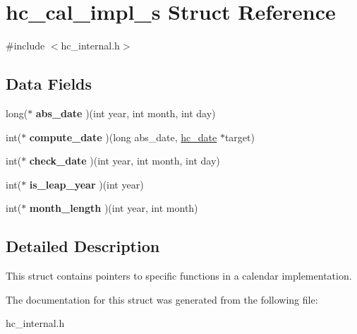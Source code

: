 \hypertarget{structhc__cal__impl__s}{}\section{hc\+\_\+cal\+\_\+impl\+\_\+s Struct Reference}
\label{structhc__cal__impl__s}


{\ttfamily \#include $<$hc\+\_\+internal.\+h$>$}

\subsection*{Data Fields}
\begin{DoxyCompactItemize}
\item 
\hypertarget{structhc__cal__impl__s_aebe9645d2a988c9b869e391441f5c6db}{}long($\ast$ {\bfseries abs\+\_\+date} )(int year, int month, int day)\label{structhc__cal__impl__s_aebe9645d2a988c9b869e391441f5c6db}

\item 
\hypertarget{structhc__cal__impl__s_ae041af72887ae7f28b82dd2f40721d7c}{}int($\ast$ {\bfseries compute\+\_\+date} )(long abs\+\_\+date, \hyperlink{hconverter_8h_a4ad842853d198774f41738d9230f4d7e}{hc\+\_\+date} $\ast$target)\label{structhc__cal__impl__s_ae041af72887ae7f28b82dd2f40721d7c}

\item 
\hypertarget{structhc__cal__impl__s_a0daac97ba91a2d646ca54bbebe54d44b}{}int($\ast$ {\bfseries check\+\_\+date} )(int year, int month, int day)\label{structhc__cal__impl__s_a0daac97ba91a2d646ca54bbebe54d44b}

\item 
\hypertarget{structhc__cal__impl__s_a69c70772881b009937d7c89beafbfbd7}{}int($\ast$ {\bfseries is\+\_\+leap\+\_\+year} )(int year)\label{structhc__cal__impl__s_a69c70772881b009937d7c89beafbfbd7}

\item 
\hypertarget{structhc__cal__impl__s_abf43e3a1aff4565299e3715b9a7b38dc}{}int($\ast$ {\bfseries month\+\_\+length} )(int year, int month)\label{structhc__cal__impl__s_abf43e3a1aff4565299e3715b9a7b38dc}

\end{DoxyCompactItemize}


\subsection{Detailed Description}
This struct contains pointers to specific functions in a calendar implementation. 

The documentation for this struct was generated from the following file\+:\begin{DoxyCompactItemize}
\item 
hc\+\_\+internal.\+h\end{DoxyCompactItemize}
